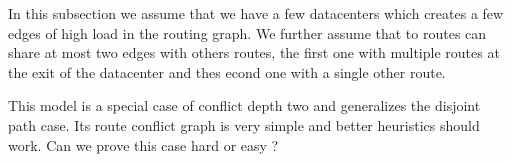 \documentclass{article}
\begin{document}
In this subsection we assume that we have a few datacenters which creates a few edges of high load
in the routing graph. We further assume that to routes can share at most two edges with others
routes, the first one with multiple routes at the exit of the datacenter and thes econd one 
with a single other route.

This model is a special case of conflict depth two and generalizes the disjoint path case.
Its route conflict graph is very simple and better heuristics should work. Can we prove this case
hard or easy ?


% 
% 
% 
% 
% 
% 
\end{document}
